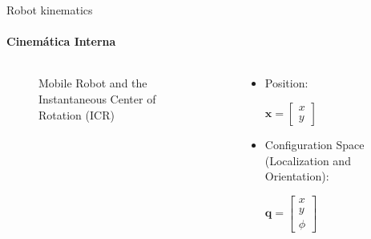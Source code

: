 \documentclass[aspectratio=169]{beamer}
\begin{document}
\begin{frame}{Robot kinematics}
    \framesubtitle{Cinemática Interna}
    \begin{columns}
        \begin{column}[c]{0.5\textwidth}
            \begin{figure}
                
                \caption{Mobile Robot and the Instantaneous Center of Rotation (ICR)}
            \end{figure}
        \end{column}
        \begin{column}[c]{0.5\textwidth}
            \centering
            \begin{itemize}
                \item Position:
                      \newline

                      $\mathbf{x} = \begin{bmatrix}
                              x \\
                              y
                          \end{bmatrix}$
                      \newline

                \item Configuration Space (Localization and Orientation):
                      \newline

                      $\mathbf{q} =
                          \begin{bmatrix}
                              x \\
                              y \\
                              \phi
                          \end{bmatrix}$
            \end{itemize}
        \end{column}
    \end{columns}
\end{frame}
\end{document}

